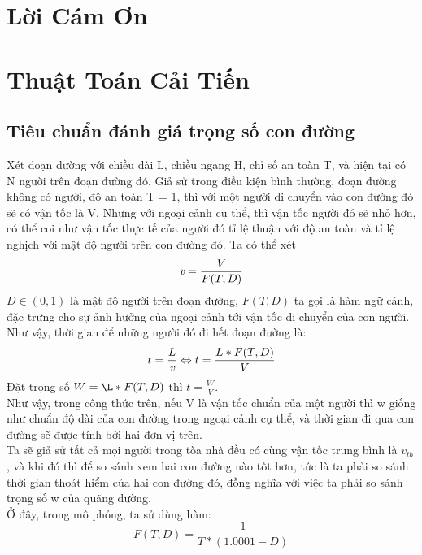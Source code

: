 \documentclass{my_style}
\begin{document}
    \maketitle

    \section*{Lời Cám Ơn}
    
    \newpage
    \tableofcontents
    \newpage 
    
    \section{Thuật Toán Cải Tiến}
    \subsection{Tiêu chuẩn đánh giá trọng số con đường}
    Xét đoạn đường với chiều dài L, chiều ngang H, chỉ số an toàn T,
    và hiện tại có N người trên đoạn đường đó. Giả sử trong điều 
    kiện bình thường, đoạn đường không có người, độ an toàn T = 1, 
    thì với một người di chuyển vào con đường đó sẽ có vận tốc là V.
    Nhưng với ngoại cảnh cụ thể, thì vận tốc người đó sẽ nhỏ hơn,
    có thể coi như vận tốc thực tế của người đó tỉ lệ thuận với độ 
    an toàn và tỉ lệ nghịch với mật độ người trên con đường đó.
    Ta có thể xét 
    \begin{equation*}
        \emph{v} = \frac{V}{F(T, D)}
    \end{equation*} 
    $D \in (0, 1)$ là mật độ người trên đoạn đường,
    $F(T, D)$ ta gọi là hàm ngữ cảnh, đặc trưng cho sự ảnh hưởng
    của ngoại cảnh tới vận tốc di chuyển của con người.
    Như vậy, thời gian để những người đó đi hết đoạn đường là:
    \begin{displaymath}
        t = \frac{L}{\emph{v}}  
        \Leftrightarrow t = \frac{L*F(T, D)}{V}   
    \end{displaymath}
    Đặt trọng số $W = \L*F(T, D)$ thì $t = \frac{W}{V}$. \\
    Như vậy, trong công thức trên, nếu V là vận tốc chuẩn của một 
    người thì w giống như chuẩn độ dài của con đường trong ngoại 
    cảnh cụ thể, và thời gian đi qua con đường sẽ được tính bởi 
    hai đơn vị trên. \\
    Ta sẽ giả sử tất cả mọi người trong tòa nhà đều có cùng vận tốc
    trung bình là $v_{tb}$, và khi đó thì để so sánh xem hai con
    đường nào tốt hơn, tức là ta phải so sánh thời gian thoát hiểm 
    của hai con đường đó, đồng nghĩa với việc ta phải so sánh trọng 
    số w của quãng đường. \\ 
    Ở đây, trong mô phỏng, ta sử dùng hàm:
    \begin{equation}
        F(T, D) = \frac{1}{T * (1.0001 - D)}
    \end{equation}
\end{document}
